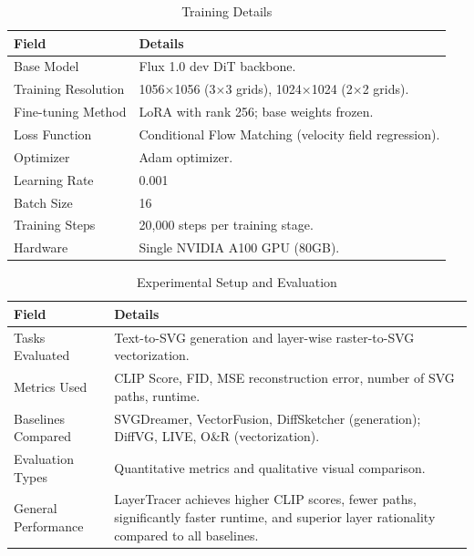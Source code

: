 \begin{table}[h!]
\centering
\caption{Training Details}
\begin{tabular}{|l|p{10cm}|}
\hline
\textbf{Field} & \textbf{Details} \\ \hline
Base Model &
Flux 1.0 dev DiT backbone. \\ \hline
Training Resolution &
1056×1056 (3×3 grids), 1024×1024 (2×2 grids). \\ \hline
Fine-tuning Method &
LoRA with rank 256; base weights frozen. \\ \hline
Loss Function &
Conditional Flow Matching (velocity field regression). \\ \hline
Optimizer &
Adam optimizer. \\ \hline
Learning Rate &
0.001 \\ \hline
Batch Size &
16 \\ \hline
Training Steps &
20,000 steps per training stage. \\ \hline
Hardware &
Single NVIDIA A100 GPU (80GB). \\ \hline
\end{tabular}
\end{table}

\begin{table}[h!]
\centering
\caption{Experimental Setup and Evaluation}
\begin{tabular}{|l|p{10cm}|}
\hline
\textbf{Field} & \textbf{Details} \\ \hline
Tasks Evaluated &
Text-to-SVG generation and layer-wise raster-to-SVG vectorization. \\ \hline
Metrics Used &
CLIP Score, FID, MSE reconstruction error, number of SVG paths, runtime. \\ \hline
Baselines Compared &
SVGDreamer, VectorFusion, DiffSketcher (generation); DiffVG, LIVE, O\&R (vectorization). \\ \hline
Evaluation Types &
Quantitative metrics and qualitative visual comparison. \\ \hline
General Performance &
LayerTracer achieves higher CLIP scores, fewer paths, significantly faster runtime, and superior layer rationality compared to all baselines. \\ \hline
\end{tabular}
\end{table}

